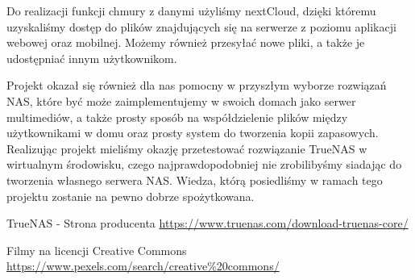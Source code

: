 \documentclass[12pt,a4paper]{article}
\newcommand{\<}{\langle}
\renewcommand{\>}{\rangle}
\theoremstyle{definition}
\begin{document}
Do realizacji funkcji chmury z danymi użyliśmy nextCloud, dzięki któremu uzyskaliśmy dostęp do plików znajdujących się na serwerze z poziomu aplikacji webowej oraz mobilnej. Możemy również przesyłać nowe pliki, a także je udostępniać innym użytkownikom.

Projekt okazał się również dla nas pomocny w przyszłym wyborze rozwiązań NAS, które być może zaimplementujemy w swoich domach jako serwer multimediów, a także prosty sposób na współdzielenie plików między użytkownikami w domu oraz prosty system do tworzenia kopii zapasowych. Realizując projekt mieliśmy okazję przetestować rozwiązanie TrueNAS w wirtualnym środowisku, czego najprawdopodobniej nie zrobilibyśmy siadając do tworzenia własnego serwera NAS. Wiedza, którą posiedliśmy w ramach tego projektu zostanie na pewno dobrze spożytkowana.

\newpage
{}
\begin{thebibliography}{}

 TrueNAS - Strona producenta
\newline\url{https://www.truenas.com/download-truenas-core/}

 Filmy na licencji Creative Commons
\newline\url{https://www.pexels.com/search/creative%20commons/}


\end{thebibliography}
%
%
\end{document}
